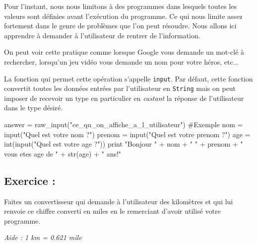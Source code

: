Pour l'instant, nous nous limitons à des programmes dans lesquels toutes les valeurs sont définies avant l'exécution du programme. Ce qui nous limite assez fortement dans le genre de problèmes que l'on peut résoudre. Nous allons ici apprendre à demander à l'utilisateur de rentrer de l'information. 

On peut voir cette pratique comme lorsque Google vous demande un mot-clé à rechercher, lorsqu'un jeu vidéo vous demande un nom pour votre héros, etc...

La fonction qui permet cette opération s'appelle \texttt{input}. Par défaut, cette fonction convertit toutes les données entrées par l'utilisateur en \texttt{String} mais on peut imposer de recevoir un type en particulier en \textit{castant} la réponse de l'utilisateur dans le type désiré. 

\begin{python}[caption = fonction \texttt{input}]
answer = raw_input("ce_qu_on_affiche_a_l_utilisateur")
#Exemple
nom = input("Quel est votre nom ?")
prenom = input("Quel est votre prenom ?")
age = int(input("Quel est votre age ?"))
print "Bonjour " + nom + " " + prenom + " vous etes age de " + str(age) + " ans!"
\end{python}


\subsection{Exercice : } Faites un convertisseur qui demande à l'utilisateur des kilomètres et qui lui renvoie ce chiffre converti en miles en le remerciant d'avoir utilisé votre programme.

\textit{Aide : 1 km = 0.621 mile}
\label{convertisseur}